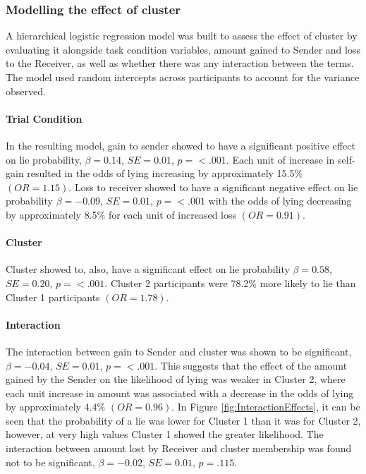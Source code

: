 \documentclass[man, floatsintext]{apa7}
\begin{document}
\subsubsection{Modelling the effect of cluster}

A hierarchical logistic regression model was built to assess the effect of cluster by evaluating it alongside task condition variables, amount gained to Sender and loss to the Receiver, as well as whether there was any interaction between the terms. The model used random intercepts across participants to account for the variance observed.

\paragraph{Trial Condition} 
In the resulting model, gain to sender showed to have a significant positive effect on lie probability, $\beta = 0.14$, $SE = 0.01$, $p = < .001$. Each unit of increase in self-gain resulted in the odds of lying increasing by approximately 15.5\% $(OR=1.15)$. Loss to receiver showed to have a significant negative effect on lie probability $\beta = -0.09$, $SE = 0.01$, $p = < .001$ with the odds of lying decreasing by approximately 8.5\% for each unit of increased loss $(OR=0.91)$. 
\paragraph{Cluster} 
Cluster showed to, also, have a significant effect on lie probability $\beta = 0.58$, $SE = 0.20$, $p = < .001$. Cluster 2 participants were 78.2\% more likely to lie than Cluster 1 participants $(OR=1.78)$.
\paragraph{Interaction}
The interaction between gain to Sender and cluster was shown to be significant, $\beta = -0.04$, $SE = 0.01$, $p = < .001$. This suggests that the effect of the amount gained by the Sender on the likelihood of lying was weaker in Cluster 2, where each unit increase in amount was associated with a decrease in the odds of lying by approximately 4.4\% $(OR=0.96)$. In Figure \ref{fig:InteractionEffects}, it can be seen that the probability of a lie was lower for Cluster 1 than it was for Cluster 2, however, at very high values Cluster 1 showed the greater likelihood. The interaction between amount lost by Receiver and cluster membership was found not to be significant, $\beta = -0.02$, $SE = 0.01$, $p = .115$.
\end{document}
